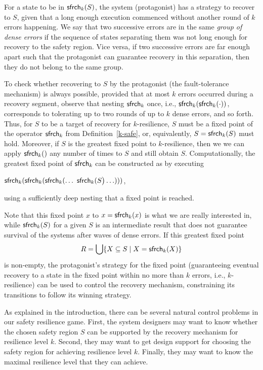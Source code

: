 For a state to be in $\mathsf{sfrch}_k(S)$, 
the system (protagonist) has a strategy to recover to $S$, 
given that a long enough execution commenced 
without another round of $k$ errors happening.
We say that two successive errors are in the same 
\emph{group of dense errors} 
if the sequence of states separating them 
was not long enough for recovery to the safety region.
Vice versa, if two successive errors are far enough apart 
such that the protagonist can guarantee recovery in this separation, 
then they do not belong to the same group.

To check whether recovering to $S$ by the protagonist (the fault-tolerance mechanism)
is always possible, provided that at most $k$ errors occurred during 
a recovery segment, observe that nesting 
$\mathsf{sfrch}_k$ once, i.e., $\mathsf{sfrch}_k(\mathsf{sfrch}_k(\cdot))$, corresponds
to tolerating up to two rounds of up to $k$ dense errors, and so forth.
Thus, for $S$ to be a target of recovery for $k$-resilience, 
$S$ must be a fixed point of the operator
$\mathsf{sfrch}_k$ from Definition~\ref{k-safe}, or, equivalently, 
$S=\mathsf{sfrch}_k(S)$ must hold.  
Moreover, if $S$ is the greatest fixed point to $k$-resilience, then we we can apply 
$\mathsf{sfrch}_k()$ any number of times to $S$ and still obtain $S$.  
Computationally, the greatest fixed point of $\mathsf{sfrch}_k$ can be constructed as 
by executing  
\begin{center} 
$\safe_k(\safe_k(\safe_k(\ldots\ \safe_k(S\big)\ldots)))$,
\end{center}  
using a sufficiently deep nesting that a fixed point is reached.

Note that this fixed point $x$ to $x=\mathsf{sfrch}_k(x)$ is what we are really interested in, 
while $\mathsf{sfrch}_k(S)$ for a given $S$ is an intermediate result that does not 
guarantee survival of the systems after waves of dense errors.
If this greatest fixed point
$$R = \bigcup\{X \subseteq S \mid X = \mathsf{sfrch}_k ( X )\}$$ is non-empty, 
the protagonist's strategy for 
the fixed point (guaranteeing eventual recovery 
to a state in the fixed point within no more than $k$ errors, i.e., $k$-resilience) 
can be used to control the recovery mechanism, 
constraining its transitions to follow its winning strategy.

As explained in the introduction, there can be several natural control problems in our safety resilience game.
First, the system designers may want to know whether the chosen safety region $S$ can be supported by the recovery mechanism for resilience level $k$.  
Second, they may want to get design support for choosing the safety region for achieving resilience level $k$.  
Finally, they may want to know the maximal resilience level that they can achieve. 

